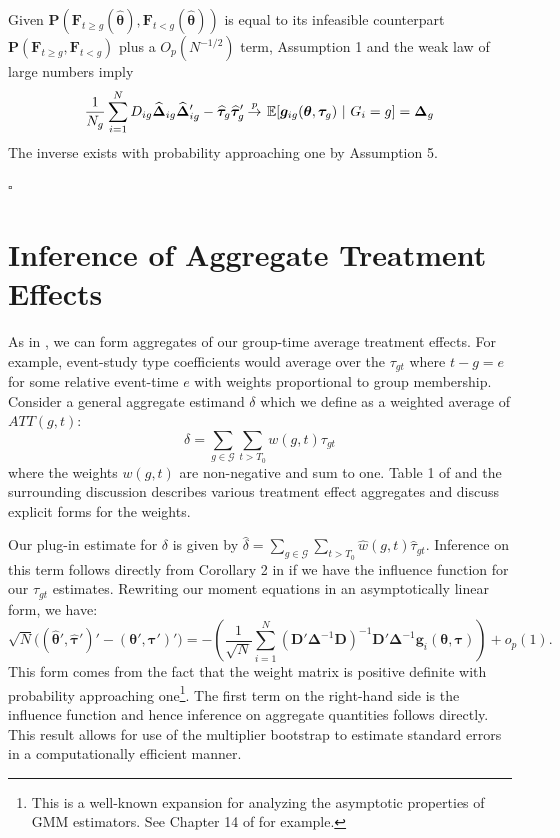 \documentclass[12pt]{article}
\begin{document}
Given $\bm P(\bm F_{t \geq g}(\widehat{\bm \theta}), \bm F_{t < g}(\widehat{\bm \theta}))$ is equal to its infeasible counterpart $\bm P(\bm F_{t \geq g}, \bm F_{t < g})$ plus a $O_p(N^{-1/2})$ term, Assumption 1 and the weak law of large numbers imply 
\begin{equation*}
    \frac{1}{N_g} \sum_{i = 1}^N D_{ig} \widehat{\bm \Delta}_{ig} \widehat{\bm \Delta}_{ig}' - \widehat{\bm \tau}_g \widehat{\bm \tau}_g' \plim \E{\bm g_{ig}(\bm \theta, \bm \tau_g)}{G_i = g} = \bm \Delta_g
\end{equation*}
The inverse exists with probability approaching one by Assumption 5.

$\square$


\section{Inference of Aggregate Treatment Effects}

As in \citet{Callaway_Santanna_2021}, we can form aggregates of our group-time average treatment effects. For example, event-study type coefficients would average over the $\tau_{gt}$ where $t - g = e$ for some relative event-time $e$ with weights proportional to group membership. Consider a general aggregate estimand $\delta$ which we define as a weighted average of $ATT(g,t)$:
\begin{equation}
\delta = \sum_{g\in \mathcal{G}} \sum_{t > T_0} w(g,t) \tau_{gt}
\end{equation}
where the weights $w(g,t)$ are non-negative and sum to one. Table 1 of \citet{Callaway_Santanna_2021} and the surrounding discussion describes various treatment effect aggregates and discuss explicit forms for the weights. 

Our plug-in estimate for $\delta$ is given by $\hat{\delta} = \sum_{g\in \mathcal{G}} \sum_{t > T_0} \hat{w}(g,t) \hat{\tau}_{gt}$. Inference on this term follows directly from Corollary 2 in \citet{Callaway_Santanna_2021} if we have the influence function for our $\tau_{gt}$ estimates. Rewriting our moment equations in an asymptotically linear form, we have:
\begin{equation}
    \sqrt{N}\Big( (\widehat{\bm \theta}', \widehat{\bm \tau}')' - (\bm \theta', \bm \tau')' \Big) = - \left( \frac{1}{\sqrt{N}} \sum_{i = 1}^N (\bm D' \bm \Delta^{-1} \bm D)^{-1} \bm D' \bm \Delta^{-1} \bm g_i(\bm \theta, \bm \tau) \right) + o_p(1).
\end{equation}
This form comes from the fact that the weight matrix is positive definite with probability approaching one\footnote{This is a well-known expansion for analyzing the asymptotic properties of GMM estimators. See Chapter 14 of \citet{Wooldridge_2010} for example.}. The first term on the right-hand side is the influence function and hence inference on aggregate quantities follows directly. This result allows for use of the multiplier bootstrap to estimate standard errors in a computationally efficient manner.
\end{document}
